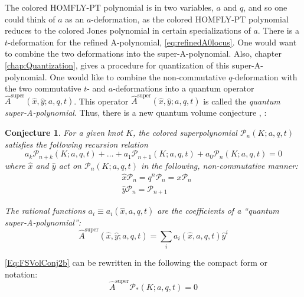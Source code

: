 \documentclass[a4paper,titlepage,twoside]{book}
\newtheorem{conjecture}{Conjecture}
\begin{document}
The colored HOMFLY-PT polynomial is in two variables, $a$ and $q$, and so one could think of $a$ as an $a$-deformation, as the colored HOMFLY-PT polynomial reduces to the colored Jones polynomial in certain specializations of $a$.  There is a $t$-deformation for the refined A-polynomial, \eqref{eq:refinedA0locus}.  One would want to combine the two deformations into the super-A-polynomial.  Also, chapter \ref{chap:Quantization}, gives a procedure for quantization of this super-A-polynomial.  One would like to combine the non-commutative $q$-deformation with the two commutative $t$- and $a$-deformations into a quantum operator $\widehat{A}^{\text{super}}(\widehat{x},\widehat{y};a,q,t)$.  This operator $\widehat{A}^{\text{super}}(\widehat{x}, \widehat{y};a,q,t)$ is called the \emph{quantum super-A-polynomial}.  Thus, there is a new quantum volume conjecture \cite{bib:FGS2012}, \cite{FujiSulkowski2013}:
\begin{conjecture} %
  For a given knot $K$, the colored superpolynomial $\mathcal{P}_n(K;a,q,t)$ satisfies the following recursion relation
\begin{equation}
  a_k \mathcal{P}_{n+k}(K; a,q,t) + \dots + a_1 \mathcal{P}_{n+1}(K;a,q,t) + a_0 \mathcal{P}_n(K;a,q,t) = 0  \label{Eq:FSVolConj2a}
\end{equation}
where $\widehat{x}$ and $\widehat{y}$ act on $\mathcal{P}_n(K;a,q,t)$ in the following, non-commutative manner:
\begin{equation}
  \begin{aligned}
    & \widehat{x}\mathcal{P}_n = q^n \mathcal{P}_n = x \mathcal{P}_n \\ 
    & \widehat{y} \mathcal{P}_n = \mathcal{P}_{n+1}
  \end{aligned} \label{eq:xycoloredsP}
\end{equation}

The rational functions $a_i \equiv a_i(\widehat{x},a,q,t)$ are the coefficients of a ``quantum super-A-polynomial'':
\begin{equation}
  \widehat{A}^{\text{super}}(\widehat{x},\widehat{y}; a,q,t) = \sum_i a_i(\widehat{x}, a,q,t)\widehat{y}^i  \label{Eq:FSVolConj2b}
\end{equation}
\end{conjecture}

\eqref{Eq:FSVolConj2b} can be rewritten in the following the compact form or notation:
\begin{equation}
  \widehat{A}^{\text{super}} \mathcal{P}_*(K;a,q,t) = 0
\end{equation}
\end{document}

